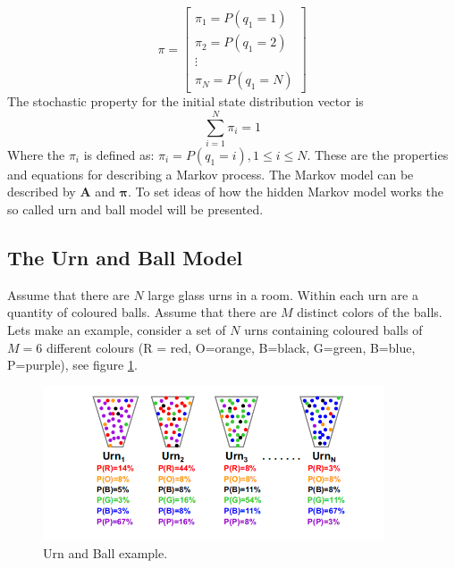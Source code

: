 \documentclass[12pt, a4paper, twoside]{report}
\begin{document}
\begin{equation*}
\pi = \begin{bmatrix}
\pi_1 \! = \! P(q_1 \! = \! 1) \\ 
\pi_2 \! = \! P(q_1 \! = \! 2) \\ 
\vdots \\ 
\pi_N \! = \! P(q_1 \! = \! N)
\end{bmatrix}
\end{equation*}
The stochastic property for the initial state distribution vector is
\begin{equation*}
\sum_{i=1}^{N} \pi_i = 1
\end{equation*}
Where the $\pi_i$ is defined as: $\pi_i \! = \! P(q_1 \! = \! i), 1 \leq i \leq N$. These are the properties and equations for describing a Markov process. The Markov model can be described by $\mathbf{A}$ and $\mathbf{\pi}$. To set ideas of how the hidden Markov model works the so called urn and ball model will be presented.

\subsection{The Urn and Ball Model}
Assume that there are $N$ large glass urns in a room. Within each urn are a quantity of coloured balls. Assume that there are $M$ distinct colors of the balls. Lets make an example, consider a set of $N$ urns containing coloured balls of $M = 6$ different colours (R = red, O=orange, B=black, G=green, B=blue, P=purple), see figure \ref{fig:urn-ball}.
\begin{figure}[!h]
	\centering
	\includegraphics[width=0.9\textwidth]
	{images/chapter4/urn-ball}
	\caption{Urn and Ball example.}
	\label{fig:urn-ball}
\end{figure}
\end{document}
